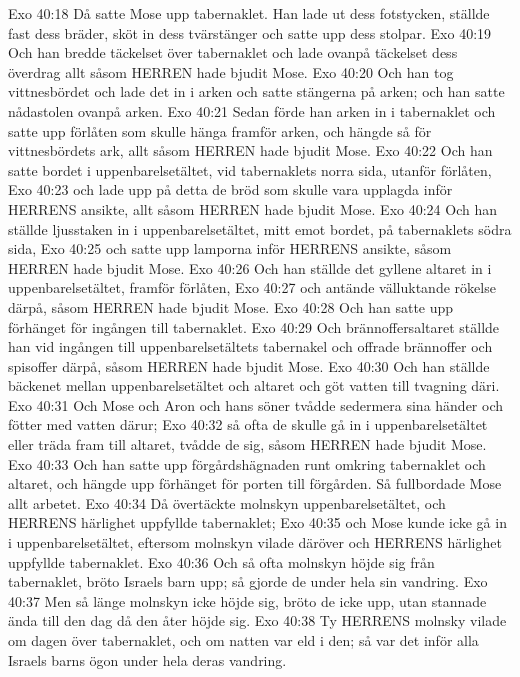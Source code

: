 Exo 40:18  Då satte Mose upp tabernaklet. Han lade ut dess fotstycken, ställde fast dess bräder, sköt in dess tvärstänger och satte upp dess stolpar.
Exo 40:19  Och han bredde täckelset över tabernaklet och lade ovanpå täckelset dess överdrag allt såsom HERREN hade bjudit Mose.
Exo 40:20  Och han tog vittnesbördet och lade det in i arken och satte stängerna på arken; och han satte nådastolen ovanpå arken.
Exo 40:21  Sedan förde han arken in i tabernaklet och satte upp förlåten som skulle hänga framför arken, och hängde så för vittnesbördets ark, allt såsom HERREN hade bjudit Mose.
Exo 40:22  Och han satte bordet i uppenbarelsetältet, vid tabernaklets norra sida, utanför förlåten,
Exo 40:23  och lade upp på detta de bröd som skulle vara upplagda inför HERRENS ansikte, allt såsom HERREN hade bjudit Mose.
Exo 40:24  Och han ställde ljusstaken in i uppenbarelsetältet, mitt emot bordet, på tabernaklets södra sida,
Exo 40:25  och satte upp lamporna inför HERRENS ansikte, såsom HERREN hade bjudit Mose.
Exo 40:26  Och han ställde det gyllene altaret in i uppenbarelsetältet, framför förlåten,
Exo 40:27  och antände välluktande rökelse därpå, såsom HERREN hade bjudit Mose.
Exo 40:28  Och han satte upp förhänget för ingången till tabernaklet.
Exo 40:29  Och brännoffersaltaret ställde han vid ingången till uppenbarelsetältets tabernakel och offrade brännoffer och spisoffer därpå, såsom HERREN hade bjudit Mose.
Exo 40:30  Och han ställde bäckenet mellan uppenbarelsetältet och altaret och göt vatten till tvagning däri.
Exo 40:31  Och Mose och Aron och hans söner tvådde sedermera sina händer och fötter med vatten därur;
Exo 40:32  så ofta de skulle gå in i uppenbarelsetältet eller träda fram till altaret, tvådde de sig, såsom HERREN hade bjudit Mose.
Exo 40:33  Och han satte upp förgårdshägnaden runt omkring tabernaklet och altaret, och hängde upp förhänget för porten till förgården. Så fullbordade Mose allt arbetet.
Exo 40:34  Då övertäckte molnskyn uppenbarelsetältet, och HERRENS härlighet uppfyllde tabernaklet;
Exo 40:35  och Mose kunde icke gå in i uppenbarelsetältet, eftersom molnskyn vilade däröver och HERRENS härlighet uppfyllde tabernaklet.
Exo 40:36  Och så ofta molnskyn höjde sig från tabernaklet, bröto Israels barn upp; så gjorde de under hela sin vandring.
Exo 40:37  Men så länge molnskyn icke höjde sig, bröto de icke upp, utan stannade ända till den dag då den åter höjde sig.
Exo 40:38  Ty HERRENS molnsky vilade om dagen över tabernaklet, och om natten var eld i den; så var det inför alla Israels barns ögon under hela deras vandring.


